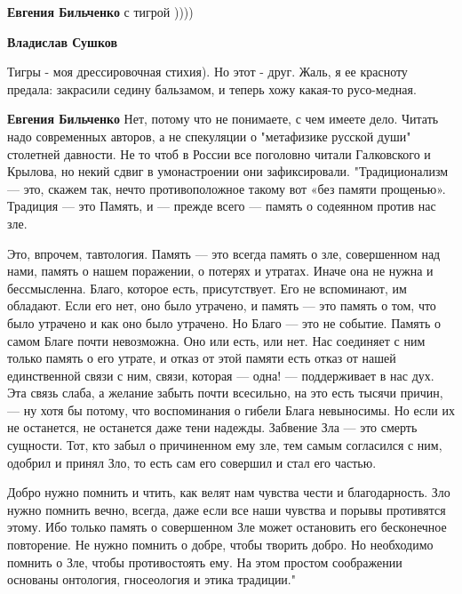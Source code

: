 \begin{itemize}
\begin{itemize}
\textbf{Евгения Бильченко} с тигрой ))))



\textbf{Владислав Сушков} 

Тигры - моя дрессировочная стихия). Но этот - друг. Жаль, я ее красноту
предала: закрасили седину бальзамом, и теперь хожу какая-то русо-медная.



\textbf{Евгения Бильченко} Нет, потому что не понимаете, с чем имеете дело.
Читать надо современных авторов, а не спекуляции о "метафизике русской души"
столетней давности. Не то чтоб в России все поголовно читали Галковского и
Крылова, но некий сдвиг в умонастроении они зафиксировали. "Традиционализм —
это, скажем так, нечто противоположное такому вот «без памяти прощенью».
Традиция — это Память, и — прежде всего — память о содеянном против нас зле.

Это, впрочем, тавтология. Память — это всегда память о зле, совершенном над
нами, память о нашем поражении, о потерях и утратах. Иначе она не нужна и
бессмысленна. Благо, которое есть, присутствует. Его не вспоминают, им
обладают. Если его нет, оно было утрачено, и память — это память о том, что
было утрачено и как оно было утрачено. Но Благо — это не событие. Память о
самом Благе почти невозможна. Оно или есть, или нет. Нас соединяет с ним только
память о его утрате, и отказ от этой памяти есть отказ от нашей единственной
связи с ним, связи, которая — одна! — поддерживает в нас дух. Эта связь слаба,
а желание забыть почти всесильно, на это есть тысячи причин, — ну хотя бы
потому, что воспоминания о гибели Блага невыносимы. Но если их не останется, не
останется даже тени надежды. Забвение Зла — это смерть сущности. Тот, кто забыл
о причиненном ему зле, тем самым согласился с ним, одобрил и принял Зло, то
есть сам его совершил и стал его частью.

Добро нужно помнить и чтить, как велят нам чувства чести и благодарность. Зло
нужно помнить вечно, всегда, даже если все наши чувства и порывы противятся
этому. Ибо только память о совершенном Зле может остановить его бесконечное
повторение. Не нужно помнить о добре, чтобы творить добро. Но необходимо
помнить о Зле, чтобы противостоять ему. На этом простом соображении основаны
онтология, гносеология и этика традиции." 


\end{itemize}
\end{itemize}
